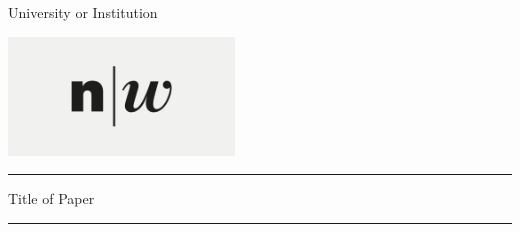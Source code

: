 \begin{titlepage}

\centering

\LARGE{University or Institution}


\vspace*{2cm}


\includegraphics[width=6cm]{figures/logo.jpg}



\rule{\linewidth}{0.1mm}\vspace*{0.5\baselineskip}


\LARGE{Title of Paper}


\rule{\linewidth}{0.1mm}\vspace*{0.5\baselineskip}


\end{titlepage}

